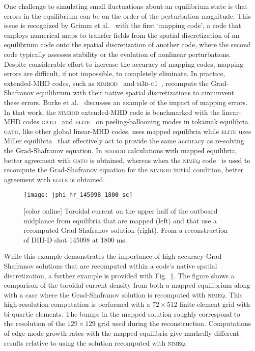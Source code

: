 \documentclass[english,aps,superscriptaddress,showkeys,showpacs,prepri,twocolumn]{revtex4}
\begin{document}
One challenge to simulating small fluctuations about an equilibrium state is
that errors in the equilibrium can be on the order of the perturbation
magnitude. This issue is recognized by Grimm et al.~\cite{grimm76} with the
first `mapping code', a code that employs numerical maps to transfer fields
from the spatial discretization of an equilibrium code onto the spatial
discretization of another code, where the second code typically assesses
stability or the evolution of nonlinear perturbations. Despite considerable
effort to increase the accuracy of mapping codes, mapping errors are difficult,
if not impossible, to completely eliminate.  In practice, extended-MHD codes,
such as \textsc{nimrod}~\cite{sovinec04,Sovinec10} and
\textsc{m3d-c1}~\cite{jardin2007high,Ferraro10}, recompute the Grad-Shafranov
equilibrium with their native spatial discretizations to circumvent these
errors. Burke et al.~\cite{Burke10} discusses an example of the impact of
mapping errors.  In that work, the \textsc{nimrod} extended-MHD code is
benchmarked with the linear-MHD codes \textsc{gato}~\cite{bernard1981gato} and
\textsc{elite}~\cite{Snyder02} on peeling-ballooning modes in tokamak
equilibria. \textsc{gato}, like other global linear-MHD codes, uses mapped
equilibria while \textsc{elite} uses Miller equilibria~\cite{miller98} that
effectively act to provide the same accuracy as re-solving the Grad-Shafranov
equation. In \textsc{nimrod} calculations with mapped equilibria, better
agreement with \textsc{gato} is obtained, whereas when the \textsc{nimeq}
code~\cite{Howell14} is used to recompute the Grad-Shafranov equation for the
\textsc{nimrod} initial condition, better agreement with \textsc{elite} is
obtained.  

\begin{figure}
\begin{center}
\texttt{[image: jphi\_hr\_145098\_1800\_sc]}
\caption{ [color online]
Toroidal current on the upper half of the outboard midplance from equilibria
that are mapped (left) and that use a recomputed Grad-Shafranov solution
(right). From a reconstruction of DIII-D shot 145098 at 1800 ms.
}
\label{fig:jphiHR}
\end{center}
\end{figure}

While this example demonstrates the importance of high-accuracy Grad-Shafranov
solutions that are recomputed within a code's native spatial discretization, a
further example is provided with Fig.~\ref{fig:jphiHR}. The figure shows a
comparison of the toroidal current density from both a mapped equilibrium 
along with a case where the Grad-Shafranov solution
is recomputed with \textsc{nimeq}. This high-resolution computation is
performed with a $72\times512$ finite-element grid with bi-quartic elements.
The bumps in the mapped solution roughly correspond to the resolution of the
$129\times129$ grid used during the reconstruction. Computations of edge-mode
growth rates with the mapped equilibria give markedly different results
relative to using the solution recomputed with \textsc{nimeq}.
\end{document}
